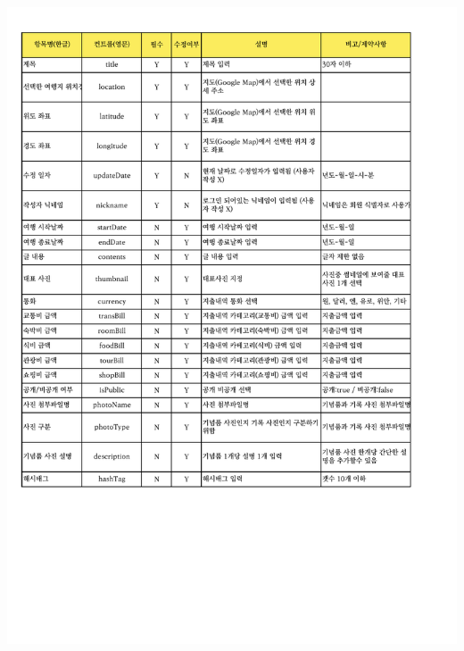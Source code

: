 {{{{{{{{{{{\includegraphics[width=20cm]{./Figure/Analysis/Display/diary/diary_10.pdf} \\
}}}}}}}}}}}
